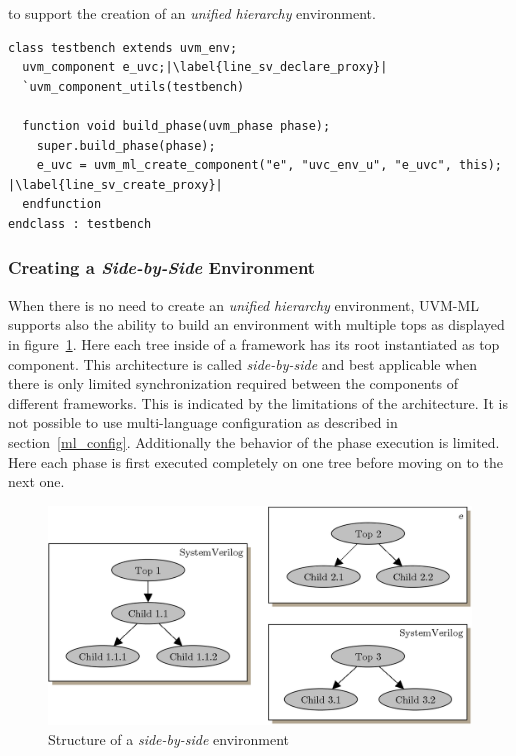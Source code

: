 to support the creation of an \emph{unified hierarchy} environment.
\medskip
\lstset{language=SystemVerilog, numbers = left, escapechar=|, breaklines=true}
\begin{lstlisting}[frame=htrbl, caption={SystemVerilog: instantiating an e unit}, label={lst:SV_unified_top}]
class testbench extends uvm_env;
  uvm_component e_uvc;|\label{line_sv_declare_proxy}|
  `uvm_component_utils(testbench)

  function void build_phase(uvm_phase phase);
    super.build_phase(phase);
    e_uvc = uvm_ml_create_component("e", "uvc_env_u", "e_uvc", this); |\label{line_sv_create_proxy}|
  endfunction
endclass : testbench
\end{lstlisting}

\subsubsection{Creating a \emph{Side-by-Side} Environment}

When there is no need to create an \emph{unified hierarchy} environment, UVM-ML supports also the ability to build an
environment with multiple tops as displayed in figure~\ref{fig:UVM_ML_side_by_side}. Here each tree inside of a
framework has its root instantiated as top component. This architecture is called \emph{side-by-side} and best
applicable when there is only limited synchronization required between the components of different frameworks. This is
indicated by the limitations of the architecture. It is not possible to use multi-language configuration as described in
section~\ref{ml_config}. Additionally the behavior of the phase execution is limited. Here each phase is first executed
completely on one tree before moving on to the next one. 

\begin{figure}[htb]
 \centering
 \includegraphics[scale=0.3]{abb/UVM_ML_side_by_side}
 \caption{Structure of a \emph{side-by-side} environment}
\label{fig:UVM_ML_side_by_side}
\end{figure}

